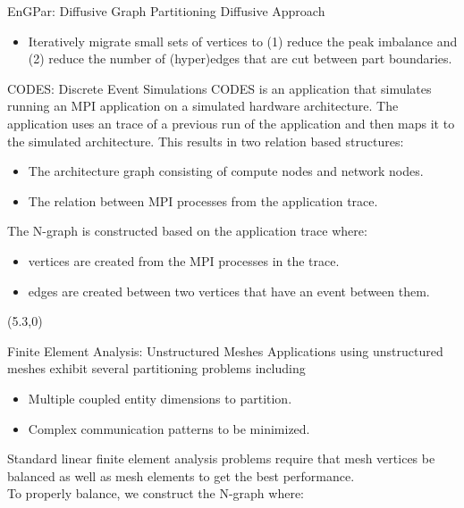 \documentclass{beamer}
\begin{document}
\begin{textblock}{15.6}
\begin{textblock}{5}
\begin{block}{EnGPar: Diffusive Graph Partitioning}
      Diffusive Approach
      \begin{itemize}
      \item Iteratively migrate small sets of vertices to (1) reduce the peak imbalance and (2) reduce the number of (hyper)edges that are cut between part boundaries.
      \end{itemize}
    \end{block}
    \begin{block}{CODES: Discrete Event Simulations}
      CODES is an application that simulates running an MPI application on a simulated
      hardware architecture. The application uses an trace of a previous run of the
      application and then maps it to the simulated architecture. This results in two
      relation based structures:
      \begin{itemize}
      \item The architecture graph consisting of compute nodes and network nodes.
      \item The relation between MPI processes from the application trace.
      \end{itemize}
      The N-graph is constructed based on the application trace where:
      \begin{itemize}
        \item vertices are created from the MPI processes in the trace.
        \item edges are created between two vertices that have an event between them.
      \end{itemize}
    \end{block}
  \end{textblock}
  \begin{textblock}{5}(5.3,0)
    \begin{block}{Finite Element Analysis: Unstructured Meshes}
      Applications using unstructured meshes exhibit several partitioning problems including
      \begin{itemize}
      \item Multiple coupled entity dimensions to partition.
      \item Complex communication patterns to be minimized.
      \end{itemize}
      Standard linear finite element analysis problems require that mesh vertices be balanced as well as mesh elements to get the best performance.\\
      To properly balance, we construct the N-graph where:

\end{block}
\end{textblock}
\end{textblock}
\end{document}
